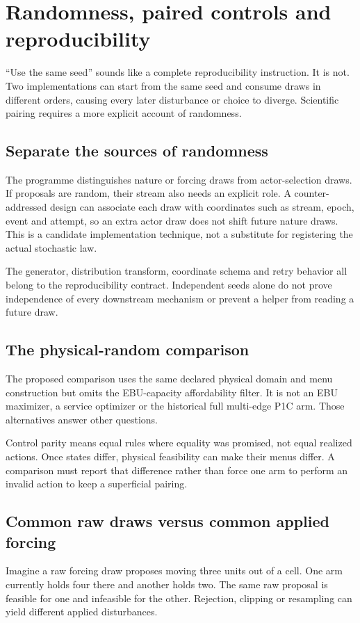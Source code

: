 \chapter{Randomness, paired controls and reproducibility}\label{ch:randomness}
``Use the same seed'' sounds like a complete reproducibility instruction.
It is not. Two implementations can start from the same seed and consume
draws in different orders, causing every later disturbance or choice to
diverge. Scientific pairing requires a more explicit account of randomness.

\section{Separate the sources of randomness}
The programme distinguishes nature or forcing draws from actor-selection
draws. If proposals are random, their stream also needs an explicit role.
A counter-addressed design can associate each draw with coordinates such
as stream, epoch, event and attempt, so an extra actor draw does not shift
future nature draws. This is a candidate implementation technique, not
a substitute for registering the actual stochastic law.

The generator, distribution transform, coordinate schema and retry behavior
all belong to the reproducibility contract. Independent seeds alone do not
prove independence of every downstream mechanism or prevent a helper from
reading a future draw.

\section{The physical-random comparison}
The proposed comparison uses the same declared physical domain and menu
construction but omits the EBU-capacity affordability filter. It is not an
EBU maximizer, a service optimizer or the historical full multi-edge P1C
arm. Those alternatives answer other questions.

Control parity means equal rules where equality was promised, not equal
realized actions. Once states differ, physical feasibility can make their
menus differ. A comparison must report that difference rather than force
one arm to perform an invalid action to keep a superficial pairing.

\section{Common raw draws versus common applied forcing}
Imagine a raw forcing draw proposes moving three units out of a cell.
One arm currently holds four there and another holds two. The same raw
proposal is feasible for one and infeasible for the other. Rejection,
clipping or resampling can yield different applied disturbances.

